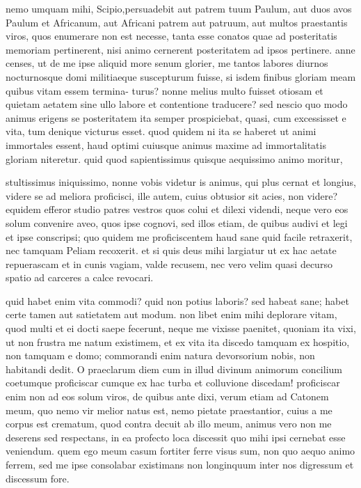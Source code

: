  nemo umquam mihi, Scipio,persuadebit aut patrem tuum Paulum, aut duos avos Paulum et Africanum, aut Africani patrem aut patruum, aut multos praestantis viros, quos enumerare non est necesse, tanta esse conatos quae ad posteritatis memoriam pertinerent, nisi animo cernerent posteritatem ad ipsos pertinere. anne censes, ut de me ipse aliquid more senum glorier, me tantos labores diurnos nocturnosque domi militiaeque suscepturum fuisse, si isdem finibus gloriam meam quibus vitam essem termina- turus? nonne melius multo fuisset otiosam et quietam aetatem sine ullo labore et contentione traducere? sed nescio quo modo animus erigens se posteritatem ita semper prospiciebat, quasi, cum excessisset e vita, tum denique victurus esset. quod quidem ni ita se haberet ut animi immortales essent, haud optimi cuiusque animus maxime ad immortalitatis gloriam niteretur. quid quod sapientissimus quisque aequissimo animo moritur,

 stultissimus iniquissimo, nonne vobis videtur is animus, qui plus cernat et longius, videre se ad meliora proficisci, ille autem, cuius obtusior sit acies, non videre? equidem efferor studio patres vestros quos colui et dilexi videndi, neque vero eos solum convenire aveo, quos ipse cognovi, sed illos etiam, de quibus audivi et legi et ipse conscripsi; quo quidem me proficiscentem haud sane quid facile retraxerit, nec tamquam Peliam recoxerit. et si quis deus mihi largiatur ut ex hac aetate repuerascam et in cunis vagiam, valde recusem, nec vero velim quasi decurso spatio ad carceres a calce revocari.

 quid habet enim vita commodi? quid non potius laboris? sed habeat sane; habet certe tamen aut satietatem aut modum. non libet enim mihi deplorare vitam, quod multi et ei docti saepe fecerunt, neque me vixisse paenitet, quoniam ita vixi, ut non frustra me natum existimem, et ex vita ita discedo tamquam ex hospitio, non tamquam e domo; commorandi enim natura devorsorium nobis, non habitandi dedit. O praeclarum diem cum in illud divinum animorum concilium coetumque proficiscar cumque ex hac turba et colluvione discedam! proficiscar enim non ad eos solum viros, de quibus ante dixi, verum etiam ad Catonem meum, quo nemo vir melior natus est, nemo pietate praestantior, cuius a me corpus est crematum, quod contra decuit ab illo meum, animus vero non me deserens sed respectans, in ea profecto loca discessit quo mihi ipsi cernebat esse veniendum. quem ego meum casum fortiter ferre visus sum, non quo aequo animo ferrem, sed me ipse consolabar existimans non longinquum inter nos digressum et discessum fore.

